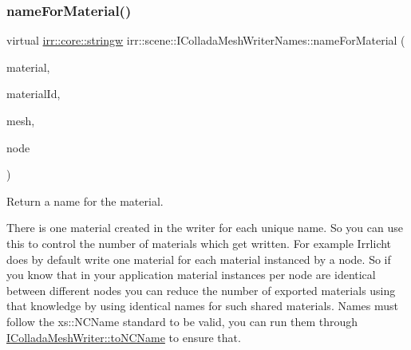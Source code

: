 \subsubsection{\texorpdfstring{name\+For\+Material()}{nameForMaterial()}\hspace{0.1cm}{\footnotesize\ttfamily [1/2]}}
{\footnotesize\ttfamily virtual \hyperlink{namespaceirr_1_1core_a5aedb62cb47cf01d1c548ab5e6344d2d}{irr\+::core\+::stringw} irr\+::scene\+::\+I\+Collada\+Mesh\+Writer\+Names\+::name\+For\+Material (\begin{DoxyParamCaption}\item[{const \hyperlink{classirr_1_1video_1_1SMaterial}{video\+::\+S\+Material} \&}]{material,  }\item[{int}]{material\+Id,  }\item[{const \hyperlink{classirr_1_1scene_1_1IMesh}{scene\+::\+I\+Mesh} $\ast$}]{mesh,  }\item[{const \hyperlink{classirr_1_1scene_1_1ISceneNode}{scene\+::\+I\+Scene\+Node} $\ast$}]{node }\end{DoxyParamCaption})\hspace{0.3cm}{\ttfamily [pure virtual]}}



Return a name for the material. 

There is one material created in the writer for each unique name. So you can use this to control the number of materials which get written. For example Irrlicht does by default write one material for each material instanced by a node. So if you know that in your application material instances per node are identical between different nodes you can reduce the number of exported materials using that knowledge by using identical names for such shared materials. Names must follow the xs\+::\+N\+C\+Name standard to be valid, you can run them through \hyperlink{classirr_1_1scene_1_1IColladaMeshWriter_ac9c48beab095aa6f4cb4f696bb2ecd45}{I\+Collada\+Mesh\+Writer\+::to\+N\+C\+Name} to ensure that. \mbox{\label{classirr_1_1scene_1_1IColladaMeshWriterNames_acb5c8f38769d3fedcc76df73d9350c07}} 
